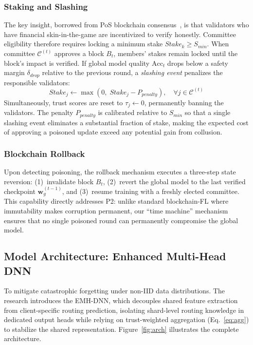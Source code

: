 \documentclass[conference]{IEEEtran}
\begin{document}
\subsubsection{Staking and Slashing}

The key insight, borrowed from PoS blockchain consensus~\cite{buterin2019casper}, is that validators who have financial skin-in-the-game are incentivized to verify honestly. Committee eligibility therefore requires locking a minimum stake $Stake_k \geq S_{min}$. When committee $\mathcal{C}^{(t)}$ approves a block $B_t$, members' stakes remain locked until the block's impact is verified. If global model quality $\text{Acc}_t$ drops below a safety margin $\delta_{drop}$ relative to the previous round, a \emph{slashing event} penalizes the responsible validators:
\begin{equation}
Stake_j \leftarrow \max(0,\; Stake_j - P_{penalty}), \quad \forall j \in \mathcal{C}^{(t)}
\label{eq:slash}
\end{equation}
Simultaneously, trust scores are reset to $\tau_j \leftarrow 0$, permanently banning the validators. The penalty $P_{penalty}$ is calibrated relative to $S_{min}$ so that a single slashing event eliminates a substantial fraction of stake, making the expected cost of approving a poisoned update exceed any potential gain from collusion.

\subsubsection{Blockchain Rollback}

Upon detecting poisoning, the rollback mechanism executes a three-step state reversion: (1)~invalidate block $B_t$, (2)~revert the global model to the last verified checkpoint $\mathbf{w}_g^{(t-1)}$, and (3)~resume training with a freshly elected committee. This capability directly addresses P2: unlike standard blockchain-FL where immutability makes corruption permanent, our ``time machine'' mechanism ensures that no single poisoned round can permanently compromise the global model.

\subsection{Model Architecture: Enhanced Multi-Head DNN}

To mitigate catastrophic forgetting under non-IID data distributions. The research introduces the EMH-DNN, which decouples shared feature extraction from client-specific routing prediction, isolating shard-level routing knowledge in dedicated output heads while relying on trust-weighted aggregation (Eq.~\ref{eq:agg}) to stabilize the shared representation. Figure~\ref{fig:arch} illustrates the complete architecture.
\end{document}

